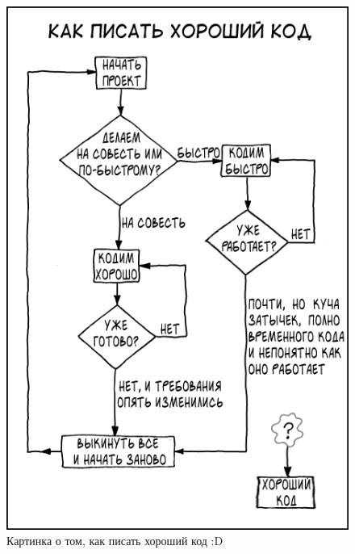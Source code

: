 \documentclass[a4paper, 12pt]{article} %
\begin{document}
\begin{figure}[h!]
    \centering \includegraphics[scale=0.4]{img/2.png}
    \caption{Картинка о том, как писать хороший код :D}
\end{figure}

\clearpage

\nocite{*}

\printbibliography
\end{document}
